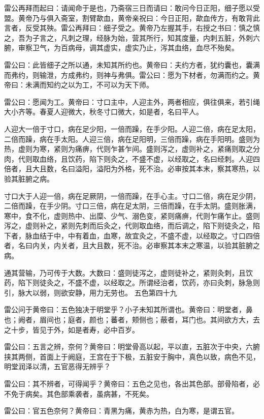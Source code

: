 \documentclass[a4paper,12pt,UTF8,twoside]{ctexbook}
\begin{document}
	雷公再拜而起曰：请闻命于是也，乃斋宿三日而请曰：敢问今日正阳，细子愿以受盟。黄帝乃与俱入斋室，割臂歃血，黄帝亲祝曰：今日正阳，歃血传方，有敢背此言者，反受其殃。雷公再拜曰：细子受之。黄帝乃左握其手，右授之书曰：慎之慎之，吾为子言之，凡刺之理，经脉为始，营其所行，知其度量，内刺五脏，外刺六腑，审察卫气，为百病母，调其虚实，虚实乃止，泻其血络，血尽不殆矣。
	
	雷公曰：此皆细子之所以通，未知其所约也。黄帝曰：夫约方者，犹约囊也，囊满而弗约，则输泄，方成弗约，则神与弗俱。雷公曰：愿为下材者，勿满而约之。黄帝曰：未满而知约之以为工，不可以为天下师。
	
	雷公曰：愿闻为工。黄帝曰：寸口主中，人迎主外，两者相应，俱往俱来，若引绳大小齐等。春夏人迎微大，秋冬寸口微大，如是者，名曰平人。
	
	人迎大一倍于寸口，病在足少阳，一倍而躁，在手少阳。人迎二倍，病在足太阳，二倍而躁，病在手太阳。人迎三倍，病在足阳明，三倍而躁，病在手阳明。盛则为热，虚则为寒，紧则为痛痹，代则乍甚乍间。盛则泻之，虚则补之，紧痛则取之分肉，代则取血络，且饮药，陷下则灸之，不盛不虚，以经取之，名曰经刺。人迎四倍者，且大且数，名曰溢阳，溢阳为外格，死不治。必审按其本末，察其寒热，以验其脏腑之病。
	
	寸口大于人迎一倍，病在足厥阴，一倍而躁，在手心主。寸口二倍，病在足少阴，二倍而躁，在手少阴。寸口三倍，病在足太阴，三倍而躁，在手太阴。盛则胀满，寒中，食不化，虚则热中、出糜、少气、溺色变，紧则痛痹，代则乍痛乍止。盛则泻之，虚则补之，紧则先刺而后灸之，代则取血络，而后调之，陷下则徒灸之，陷下者，脉血结于中，中有着血，血寒，故宜灸之，不盛不虚，以经取之。寸口四倍者，名曰内关，内关者，且大且数，死不治。必审察其本末之寒温，以验其脏腑之病。
	
	通其营输，乃可传于大数。大数曰：盛则徒泻之，虚则徒补之，紧则灸刺，且饮药，陷下则徒灸之，不盛不虚，以经取之。所谓经治者，饮药，亦曰灸刺，脉急则引，脉大以弱，则欲安静，用力无劳也。
	五色第四十九
	
	雷公问于黄帝曰：五色独决于明堂乎？小子未知其所谓也。黄帝曰：明堂者，鼻也；阙者，眉间也；庭者，颜也；蕃者，颊侧也；蔽者，耳门也。其间欲方大，去之十步，皆见于外，如是者寿，必中百岁。
	
	雷公曰：五言之辨，奈何？黄帝曰：明堂骨高以起，平以直，五脏次于中央，六腑挟其两侧，首面上于阙庭，王宫在于下极，五脏安于胸中，真色以致，病色不见，明堂润泽以清，五官恶得无辨乎？
	
	雷公曰：其不辨者，可得闻乎？黄帝曰：五色之见也，各出其色部。部骨陷者，必不免于病矣。其色部乘袭者，虽病甚，不死矣。
	
	雷公曰：官五色奈何？黄帝曰：青黑为痛，黄赤为热，白为寒，是谓五官。
	
\end{document}
